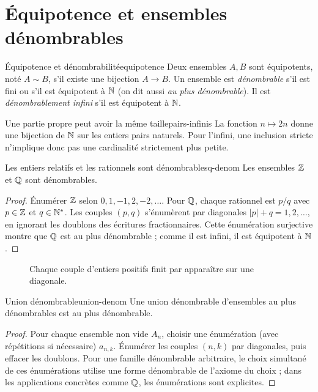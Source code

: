 \section{Équipotence et ensembles dénombrables}
\begin{definition}{Équipotence et dénombrabilité}{equipotence}
Deux ensembles $A,B$ sont équipotents, noté $A\sim B$, s'il existe une bijection $A\to B$. Un ensemble est \emph{dénombrable} s'il est fini ou s'il est équipotent à $\mathbb N$ (on dit aussi \emph{au plus dénombrable}). Il est \emph{dénombrablement infini} s'il est équipotent à $\mathbb N$.
\end{definition}
\begin{exemple}{Une partie propre peut avoir la même taille}{pairs-infinis}
La fonction $n\mapsto2n$ donne une bijection de $\mathbb N$ sur les entiers pairs naturels. Pour l'infini, une inclusion stricte n'implique donc pas une cardinalité strictement plus petite.
\end{exemple}
\begin{proposition}{Les entiers relatifs et les rationnels sont dénombrables}{q-denom}
Les ensembles $\mathbb Z$ et $\mathbb Q$ sont dénombrables.
\end{proposition}
\begin{proof}
Énumérer $\mathbb Z$ selon $0,1,-1,2,-2,\ldots$. Pour $\mathbb Q$, chaque rationnel est $p/q$ avec $p\in\mathbb Z$ et $q\in\mathbb N^*$. Les couples $(p,q)$ s'énumèrent par diagonales $|p|+q=1,2,\ldots$, en ignorant les doublons des écritures fractionnaires. Cette énumération surjective montre que $\mathbb Q$ est au plus dénombrable ; comme il est infini, il est équipotent à $\mathbb N$.
\end{proof}
\begin{figure}[htbp]\centering
{}
\caption{Chaque couple d'entiers positifs finit par apparaître sur une diagonale.}
\end{figure}
\begin{proposition}{Union dénombrable}{union-denom}
Une union dénombrable d'ensembles au plus dénombrables est au plus dénombrable.
\end{proposition}
\begin{proof}
Pour chaque ensemble non vide $A_n$, choisir une énumération (avec répétitions si nécessaire) $a_{n,k}$. Énumérer les couples $(n,k)$ par diagonales, puis effacer les doublons. Pour une famille dénombrable arbitraire, le choix simultané de ces énumérations utilise une forme dénombrable de l'axiome du choix ; dans les applications concrètes comme $\mathbb Q$, les énumérations sont explicites.
\end{proof}

